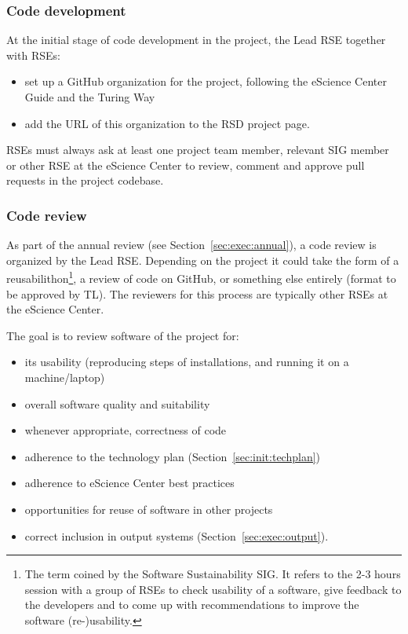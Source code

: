 \documentclass[11pt]{article}
\begin{document}
\subsubsection{Code development}
\label{sec:exec:code}
At the initial stage of code development in the project, the Lead RSE together with RSEs:

\begin{itemize}
\item set up a GitHub organization for the project, following the eScience Center Guide and the Turing Way~\cite{the_turing_way-2023}
\item add the URL of this organization to the RSD project page.
\end{itemize}

RSEs must always ask at least one project team member, relevant SIG member or other RSE at the eScience Center to
review, comment and approve pull requests in the project codebase.

\subsubsection{Code review}
As part of the annual review (see Section~\ref{sec:exec:annual}), a code review is organized by the Lead RSE. Depending
on the project it could take the form of a reusabilithon\footnote{The term coined by the Software Sustainability SIG.
It refers to the 2-3 hours session with a group of RSEs to check usability of a software, give feedback to the
developers and to come up with recommendations to improve the software (re-)usability.}, a review of code on GitHub, or
something else entirely (format to be approved by TL). The reviewers for this process are typically other RSEs at the
eScience Center.


The goal is to review software of the project for:
\begin{itemize}
\item its usability (reproducing steps of installations, and running it on a machine/laptop)
\item overall software quality and suitability
\item whenever appropriate, correctness of code
\item adherence to the technology plan (Section~\ref{sec:init:techplan})
\item adherence to eScience Center best practices
\item opportunities for reuse of software in other projects
\item correct inclusion in output systems (Section~\ref{sec:exec:output}).
\end{itemize}
\end{document}
